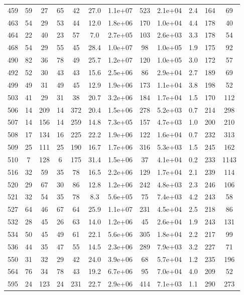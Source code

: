 \begin{table}
\begin{tabular}{cccccccccccc}
459 & 59 & 27 & 65 & 42 & 27.0 & 1.1e+07 & 523 & 2.1e+04 & 2.4 & 164 & 69 \\
463 & 54 & 29 & 53 & 44 & 12.0 & 1.8e+06 & 170 & 1.0e+04 & 4.4 & 178 & 40 \\
464 & 22 & 40 & 23 & 57 & 7.0 & 2.7e+05 & 103 & 2.6e+03 & 3.3 & 178 & 54 \\
468 & 54 & 29 & 55 & 45 & 28.4 & 1.0e+07 & 98 & 1.0e+05 & 1.9 & 175 & 92 \\
490 & 82 & 36 & 78 & 49 & 25.7 & 1.2e+07 & 120 & 1.0e+05 & 3.0 & 172 & 57 \\
492 & 52 & 30 & 43 & 43 & 15.6 & 2.5e+06 & 86 & 2.9e+04 & 2.7 & 189 & 69 \\
499 & 49 & 31 & 49 & 45 & 12.9 & 1.9e+06 & 173 & 1.1e+04 & 3.8 & 198 & 52 \\
503 & 41 & 29 & 31 & 38 & 20.7 & 3.2e+06 & 184 & 1.7e+04 & 1.5 & 170 & 112 \\
506 & 14 & 209 & 14 & 372 & 20.4 & 1.5e+06 & 278 & 5.2e+03 & 0.7 & 214 & 298 \\
507 & 14 & 156 & 14 & 259 & 14.8 & 7.3e+05 & 157 & 4.7e+03 & 1.0 & 200 & 210 \\
508 & 17 & 134 & 16 & 225 & 22.2 & 1.9e+06 & 122 & 1.6e+04 & 0.7 & 232 & 313 \\
509 & 25 & 111 & 25 & 190 & 16.7 & 1.7e+06 & 316 & 5.3e+03 & 1.5 & 245 & 162 \\
510 & 7 & 128 & 6 & 175 & 31.4 & 1.5e+06 & 37 & 4.1e+04 & 0.2 & 233 & 1143 \\
516 & 32 & 59 & 35 & 78 & 16.5 & 2.2e+06 & 129 & 1.7e+04 & 2.1 & 239 & 114 \\
520 & 29 & 67 & 30 & 86 & 12.8 & 1.2e+06 & 242 & 4.8e+03 & 2.3 & 246 & 106 \\
521 & 32 & 54 & 35 & 78 & 8.3 & 5.6e+05 & 75 & 7.4e+03 & 4.2 & 243 & 58 \\
527 & 64 & 46 & 67 & 64 & 25.9 & 1.1e+07 & 231 & 4.5e+04 & 2.5 & 218 & 86 \\
532 & 28 & 45 & 26 & 63 & 14.0 & 1.2e+06 & 45 & 2.6e+04 & 1.9 & 243 & 131 \\
534 & 50 & 45 & 49 & 61 & 22.1 & 5.6e+06 & 305 & 1.8e+04 & 2.2 & 217 & 99 \\
536 & 44 & 35 & 47 & 55 & 14.5 & 2.3e+06 & 289 & 7.9e+03 & 3.2 & 227 & 71 \\
550 & 31 & 32 & 29 & 42 & 24.0 & 3.9e+06 & 68 & 5.7e+04 & 1.2 & 235 & 196 \\
564 & 76 & 34 & 78 & 43 & 19.2 & 6.7e+06 & 95 & 7.0e+04 & 4.0 & 209 & 52 \\
595 & 24 & 123 & 24 & 231 & 22.7 & 2.9e+06 & 414 & 7.1e+03 & 1.1 & 290 & 273 \\

\end{tabular}
\end{table}
